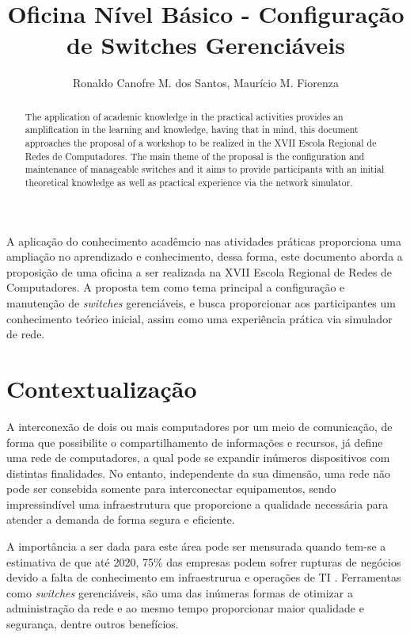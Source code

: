 \documentclass[12pt]{article}
\title{Oficina Nível Básico - Configuração de Switches Gerenciáveis}
\author{Ronaldo Canofre  M. dos Santos\inst{1}, Maurício M. Fiorenza\inst{1}}
\begin{document}
 

\maketitle

\begin{abstract}
The application of academic knowledge in the practical activities provides an amplification in the learning and knowledge, having that in mind, this document approaches the proposal of a workshop to be realized in the XVII Escola Regional de Redes de Computadores. The main theme of the proposal is the configuration and maintenance of manageable switches and it aims to provide participants with an initial theoretical knowledge as well as practical experience via the network simulator.
\end{abstract}
     
\begin{resumo} 
  A aplicação do conhecimento acadêmcio nas atividades práticas proporciona uma ampliação no aprendizado e conhecimento, dessa forma, este documento aborda a proposição de uma oficina a ser realizada na XVII Escola Regional de Redes de Computadores. A proposta tem como tema principal a configuração e manutenção de \textit{switches} gerenciáveis, e busca proporcionar aos participantes um conhecimento teórico inicial, assim como uma experiência prática via simulador de rede.
\end{resumo}


\section{Contextualização}

A interconexão de dois ou mais computadores por um meio de comunicação, de forma que possibilite o compartilhamento de informações e recursos, já define uma rede de computadores\cite{redes17}, a qual pode se expandir inúmeros dispositivos com distintas finalidades. No entanto, independente da sua dimensão, uma rede não pode ser consebida somente para interconectar equipamentos, sendo impressindível uma infraestrutura que proporcione a qualidade necessária para atender a demanda de forma segura e eficiente.

A importância a ser dada para este área pode ser mensurada quando tem-se a estimativa de que até 2020, 75\% das empresas podem sofrer rupturas de negócios devido a falta de conhecimento em infraestrurua e operações de TI \cite{gartner}. Ferramentas como \textit{switches} gerenciáveis, são uma das inúmeras formas de otimizar a administração da rede e ao mesmo tempo proporcionar maior qualidade e segurança, dentre outros benefícios.
\end{document}
